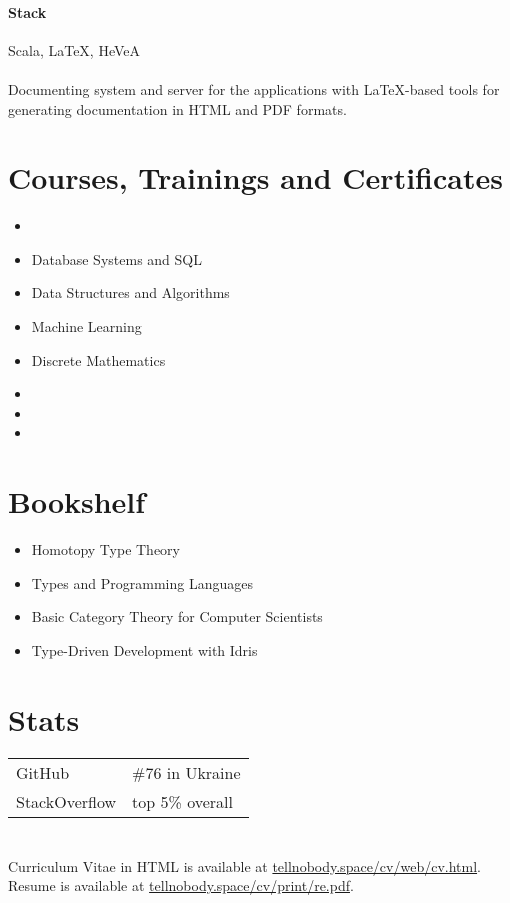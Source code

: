 \paragraph{Stack} Scala, LaTeX, HeVeA
\paragraph{}
Documenting system and server for the applications with LaTeX-based tools for generating documentation in HTML and PDF formats.

\section{Courses, Trainings and Certificates}
\begin{itemize}
  \item {}
  \item Database Systems and SQL
  \item Data Structures and Algorithms
  \item Machine Learning
  \item Discrete Mathematics
  \item {}
  \item {}
  \item {}
\end{itemize}

\section{Bookshelf}
\begin{itemize}
  \item Homotopy Type Theory
  \item Types and Programming Languages
  \item Basic Category Theory for Computer Scientists
  \item Type-Driven Development with Idris
\end{itemize}

\section{Stats}
\begin{tabular}{l|l}
GitHub & \#76 in Ukraine \\
StackOverflow & top 5\% overall
\end{tabular}

\section*{}
Curriculum Vitae in HTML is available at \href{https://tellnobody.space/cv/web/cv.html}{tellnobody.space/cv/web/cv.html}.\\
Resume is available at \href{https://tellnobody.space/cv/print/re.pdf}{tellnobody.space/cv/print/re.pdf}.

